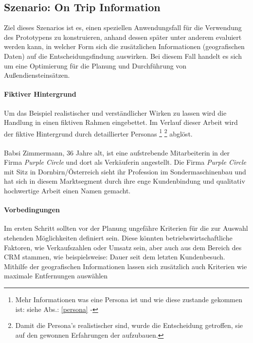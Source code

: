 \documentclass[Bachelorarbeit.tex]{subfiles}
\begin{document}
\subsection{Szenario: On Trip Information }
Ziel dieses Szenarios ist es, einen speziellen Anwendungsfall für die Verwendung des Prototypens zu konstruieren, anhand dessen später unter anderem evaluiert werden kann, in welcher Form sich die zusätzlichen Informationen (geografischen Daten) auf die Entscheidungsfindung auswirken.
Bei diesem Fall handelt es sich um eine Optimierung für die Planung und Durchführung von Außendiensteinsätzen. 

\paragraph*{Fiktiver Hintergrund}
Um das Beispiel realistischer und verständlicher Wirken zu lassen wird die Handlung in einen fiktiven Rahmen eingebettet. 
Im Verlauf dieser Arbeit wird der fiktive Hintergrund durch detaillierter Personas
\footnote{
	Mehr Informationen was eine Persona ist und wie diese zustande gekommen ist: siehe Abs.: \ref{persona} - 
	} 
\footnote{
	Damit die Persona's realistischer sind, wurde die Entscheidung getroffen,
	sie auf den gewonnen Erfahrungen der  aufzubauen.
	} 
abglöst.\\
\\
Babsi Zimmermann, 36 Jahre alt, ist eine aufstrebende Mitarbeiterin in der Firma \textit{Purple Circle} und dort als Verkäuferin angestellt. 
Die Firma \textit{Purple Circle} mit Sitz in Dornbirn/Österreich sieht ihr Profession im Sondermaschinenbau und hat sich in diesem Marktsegment durch ihre enge Kundenbindung und qualitativ hochwertige Arbeit einen Namen gemacht. 
\newpage

\paragraph*{Vorbedingungen}
Im ersten Schritt sollten vor der Planung ungefähre Kriterien für die zur Auswahl stehenden Möglichkeiten definiert sein.
Diese könnten betriebswirtschaftliche Faktoren, wie Verkaufszahlen oder Umsatz sein, aber auch aus dem Bereich des \ac{CRM} stammen, wie beispielsweise: Dauer seit dem letzten Kundenbesuch.
Mithilfe der geografischen Informationen lassen sich zusätzlich auch Kriterien wie maximale Entfernungen auswählen
\end{document}
